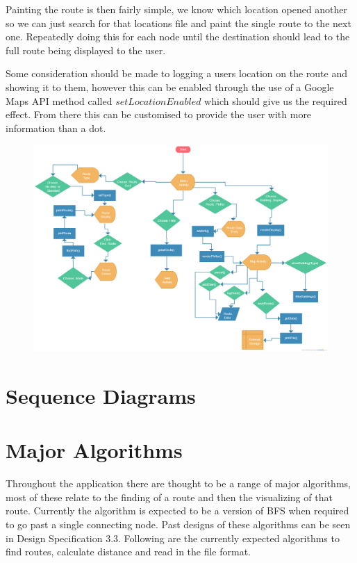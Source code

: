 Painting the route is then fairly simple, we know which location opened another so we can just search for that locations file and paint the single route to the next one. Repeatedly doing this for each node until the destination should lead to the full route being displayed to the user.

Some consideration should be made to logging a users location on  the route and showing it to them, however this can be enabled through the use of a Google Maps API method called $setLocationEnabled$ which should give us the required effect. From there this can be customised to provide the user with more information than a dot. 

\begin{figure}
\includegraphics[scale=0.24]{Chapter2/flowo.png} \\
\end{figure}
\newpage
\section{Sequence Diagrams}
\section{Major Algorithms}
Throughout the application there are thought to be a range of major algorithms, most of these relate to the finding of a route and then the visualizing of that route. Currently the algorithm is expected to be a version of BFS when required to go past a single connecting node. Past designs of these algorithms can be seen in Design Specification 3.3. Following are the currently expected algorithms to find routes, calculate distance and read in the file format.

